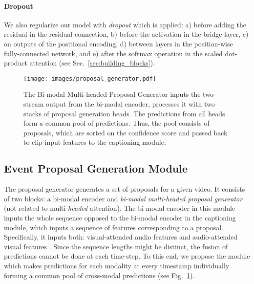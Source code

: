 \documentclass{src/bmvc2k}
\begin{document}
\vspace{-2.5ex}\paragraph{Dropout} We also regularize our model with \textit{dropout} \cite{dropout_Srivastava_2014} which is applied: a) before adding the residual in the residual connection, b) before the activation in the bridge layer, c) on outputs of the positional encoding, d) between layers in the position-wise fully-connected network, and e) after the softmax operation in the scaled dot-product attention (see Sec.~\ref{sec:building_blocks}).

\begin{figure}
\begin{minipage}[c]{0.60\textwidth}
    \texttt{[image: images/proposal\_generator.pdf]}
\end{minipage}\hfill
\begin{minipage}[c]{0.38\textwidth}
\vspace{-3.5em}\caption{The Bi-modal Multi-headed Proposal Generator inputs the two-stream output from the bi-modal encoder, processes it with two stacks of proposal generation heads. The predictions from all heads form a common pool of predictions. Thus, the pool consists of  proposals, which are sorted on the confidence score and passed back to clip input features to the captioning module. \label{fig:prop_gen}}
\vspace{-3em}
\end{minipage}
\end{figure}

\vspace{-1.3ex}\subsection{Event Proposal Generation Module\label{sec:prop_generator}}
\vspace{-0.2ex}The proposal generator generates a set of proposals for a given video. It consists of two blocks: a bi-modal encoder and \textit{bi-modal multi-headed proposal generator} (not related to multi-\textit{headed} attention). The bi-modal encoder in this module inputs the whole sequence opposed to the bi-modal encoder in the captioning module, which inputs a sequence of features corresponding to a proposal. Specifically, it inputs both: visual-attended audio features  and audio-attended visual features . Since the sequence lengths  might be distinct, the fusion of predictions cannot be done at each time-step. To this end, we propose the module which makes predictions for each modality at every timestamp individually forming a common pool of cross-modal predictions (see Fig.~\ref{fig:prop_gen}).
\end{document}
